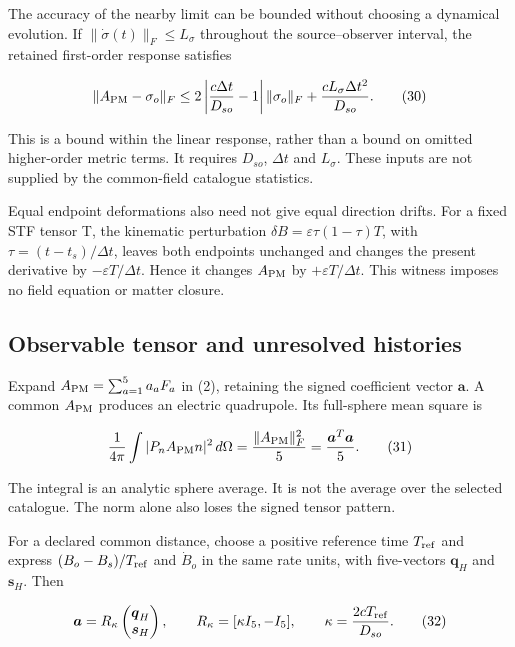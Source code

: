 The accuracy of the nearby limit can be bounded without choosing a dynamical evolution. If \(\|\dot\sigma(t)\|_F\le L_\sigma\) throughout the source--observer interval, the retained first-order response satisfies

\[
\|A_{\rm PM}-\sigma_o\|_F
\le 2\left|\frac{c\Delta t}{D_{so}}-1\right|\|\sigma_o\|_F
+\frac{c L_\sigma\Delta t^2}{D_{so}}.
\tag{30}
\]

This is a bound within the linear response, rather than a bound on omitted higher-order metric terms. It requires \(D_{so}\), \(\Delta t\) and \(L_\sigma\). These inputs are not supplied by the common-field catalogue statistics.

Equal endpoint deformations also need not give equal direction drifts. For a fixed STF tensor T, the kinematic perturbation \(\delta B=\varepsilon\tau(1-\tau)T\), with \(\tau=(t-t_s)/\Delta t\), leaves both endpoints unchanged and changes the present derivative by \(-\varepsilon T/\Delta t\). Hence it changes \(A_{\rm PM}\) by \(+\varepsilon T/\Delta t\). This witness imposes no field equation or matter closure.

\hypertarget{observable-tensor-and-unresolved-histories}{%
\subsection{Observable tensor and unresolved histories}\label{observable-tensor-and-unresolved-histories}}

Expand \(A_{\rm PM}=\sum_{a=1}^5 a_aF_a\) in (2), retaining the signed coefficient vector \(\boldsymbol a\). A common \(A_{\rm PM}\) produces an electric quadrupole. Its full-sphere mean square is

\[
\frac{1}{4\pi}\int |P_nA_{\rm PM}n|^2\,d\Omega
=\frac{\|A_{\rm PM}\|_F^2}{5}
=\frac{\boldsymbol a^T\boldsymbol a}{5}.
\tag{31}
\]

The integral is an analytic sphere average. It is not the average over the selected catalogue. The norm alone also loses the signed tensor pattern.

For a declared common distance, choose a positive reference time \(T_{\rm ref}\) and express \((B_o-B_s)/T_{\rm ref}\) and \(\dot B_o\) in the same rate units, with five-vectors \(\boldsymbol q_H\) and \(\boldsymbol s_H\). Then

\[
\boldsymbol a=R_\kappa
\begin{pmatrix}\boldsymbol q_H\\\boldsymbol s_H\end{pmatrix},
\qquad R_\kappa=[\kappa I_5,-I_5],\qquad
\kappa=\frac{2cT_{\rm ref}}{D_{so}}.
\tag{32}
\]

